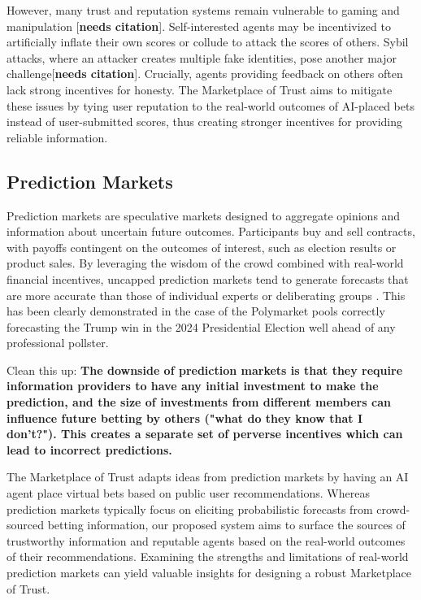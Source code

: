 \documentclass{article}
\begin{document}
However, many trust and reputation systems remain vulnerable to gaming and manipulation [\textbf{needs citation}]. Self-interested agents may be incentivized to artificially inflate their own scores or collude to attack the scores of others. Sybil attacks, where an attacker creates multiple fake identities, pose another major challenge[\textbf{needs citation}]. Crucially, agents providing feedback on others often lack strong incentives for honesty. The Marketplace of Trust aims to mitigate these issues by tying user reputation to the real-world outcomes of AI-placed bets instead of user-submitted scores, thus creating stronger incentives for providing reliable information.

\subsection{Prediction Markets}
Prediction markets are speculative markets designed to aggregate opinions and information about uncertain future outcomes. \cite{PREDICTpriceformation} Participants buy and sell contracts, with payoffs contingent on the outcomes of interest, such as election results or product sales. By leveraging the wisdom of the crowd combined with real-world financial incentives, uncapped prediction markets tend to generate forecasts that are more accurate than those of individual experts or deliberating groups \cite{PREDICTSunstein}. This has been clearly demonstrated in the case of the Polymarket pools correctly forecasting the Trump win in the 2024 Presidential Election well ahead of any professional pollster. \cite{wsj_trump_whale_2024}

Clean this up:
\textbf{The downside of prediction markets is that they require information providers to have any initial investment to make the prediction, and the size of investments from different members can influence future betting by others ("what do they know that I don't?"). This creates a separate set of perverse incentives which can lead to incorrect predictions.}

The Marketplace of Trust adapts ideas from prediction markets by having an AI agent place virtual bets based on public user recommendations. Whereas prediction markets typically focus on eliciting probabilistic forecasts from crowd-sourced betting information, our proposed system aims to surface the sources of trustworthy information and reputable agents based on the real-world outcomes of their recommendations. Examining the strengths and limitations of real-world prediction markets can yield valuable insights for designing a robust Marketplace of Trust.
\end{document}
